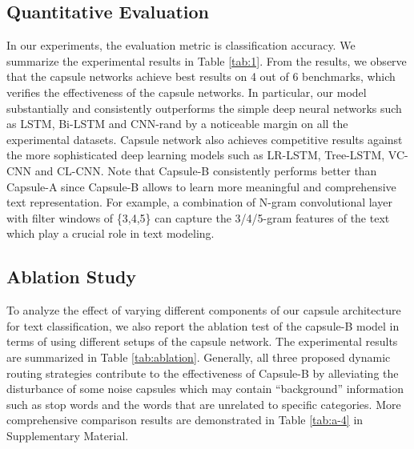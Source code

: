 \documentclass[11pt]{article}
\begin{document}
\subsection{Quantitative Evaluation}
In our experiments, the evaluation metric is classification accuracy. We summarize the experimental results in Table \ref{tab:1}.
From the results, we observe that the capsule networks achieve best results on 4 out of 6 benchmarks, which verifies the effectiveness of the capsule networks.  
In particular, our model substantially and consistently outperforms the simple deep neural networks such as LSTM, Bi-LSTM and CNN-rand by a noticeable margin on all the experimental datasets. 
Capsule network also achieves competitive results against the more sophisticated deep learning models such as LR-LSTM, Tree-LSTM, VC-CNN and CL-CNN.  
Note that Capsule-B  consistently performs better than Capsule-A since Capsule-B allows to learn more meaningful and comprehensive text representation. For example, a combination of N-gram convolutional layer with filter windows of \{3,4,5\} can capture the 3/4/5-gram features of the text which play a crucial role in text modeling.


\subsection{Ablation Study}
To analyze the effect of varying different components of our capsule architecture for text classification, we also report the ablation test of the capsule-B model in terms of using different setups of the capsule network. 
The experimental results are summarized in Table \ref{tab:ablation}. 
Generally, all three proposed dynamic routing strategies contribute to the effectiveness of Capsule-B by alleviating the disturbance of some noise capsules which may contain ``background'' information such as stop words and the words that are unrelated to specific categories. 
More comprehensive comparison results are demonstrated in Table \ref{tab:a-4} in Supplementary Material.
\end{document}
